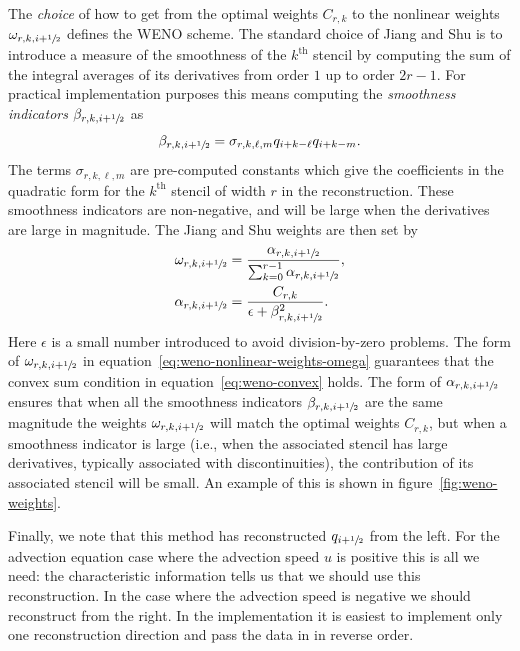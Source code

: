 The \emph{choice} of how to get from the optimal weights $C_{r, k}$ to the
nonlinear weights $\omega_{r, k, i+{\sfrac{1}{2}}}$ defines the WENO scheme. The
standard choice of Jiang and Shu is to introduce a measure of the smoothness of
the $k^{\text{th}}$ stencil by computing the sum of the integral averages of
its derivatives from order $1$ up to order $2 r - 1$. For practical
implementation purposes this means computing the \emph{smoothness indicators}
$\beta_{r, k, i+{\sfrac{1}{2}}}$ as
\begin{equation}
  \label{eq:weno-smoothness}
  \beta_{r, k, i+{\sfrac{1}{2}}} = \sigma_{r, k, \ell, m} q_{i+k-\ell} q_{i+k-m}.
\end{equation}
The terms $\sigma_{r, k, \ell, m}$ are pre-computed constants which give the
coefficients in the quadratic form for the $k^{\text{th}}$ stencil of width $r$
in the reconstruction. These smoothness indicators are non-negative, and will
be large when the derivatives are large in magnitude. The Jiang and Shu weights
are then set by
\begin{subequations}
  \label{eq:weno-nonlinear-weights}
  \begin{align}
    \label{eq:weno-nonlinear-weights-omega}
    \omega_{r, k, i+{\sfrac{1}{2}}} &= \frac{\alpha_{r, k, i+{\sfrac{1}{2}}}}{\sum_{k=0}^{r-1} \alpha_{r, k, i+{\sfrac{1}{2}}}}, \\
      \label{eq:weno-nonlinear-weights-alpha}
    \alpha_{r, k, i+{\sfrac{1}{2}}} &= \frac{C_{r, k}}{\epsilon + \beta_{r, k, i+{\sfrac{1}{2}}}^2}.
  \end{align}
\end{subequations}
Here $\epsilon$ is a small number introduced to avoid division-by-zero problems.
The form of $\omega_{r, k, i+{\sfrac{1}{2}}}$ in
equation~\eqref{eq:weno-nonlinear-weights-omega} guarantees that the convex sum
condition in equation~\eqref{eq:weno-convex} holds. The form of $\alpha_{r, k,
i+{\sfrac{1}{2}}}$ ensures that when all the smoothness indicators $\beta_{r, k,
i+{\sfrac{1}{2}}}$ are the same magnitude the weights $\omega_{r, k, i+{\sfrac{1}{2}}}$ will
match the optimal weights $C_{r, k}$, but when a smoothness indicator is large
(i.e., when the associated stencil has large derivatives, typically associated
with discontinuities), the contribution of its associated stencil will be small.
An example of this is shown in figure~\ref{fig:weno-weights}.

Finally, we note that this method has reconstructed $q_{i+{\sfrac{1}{2}}}$ from the
left. For the advection equation case where the advection speed $u$ is positive
this is all we need: the characteristic information tells us that we should use
this reconstruction. In the case where the advection speed is negative we
should reconstruct from the right. In the implementation it is easiest to
implement only one reconstruction direction and pass the data in in reverse
order.


